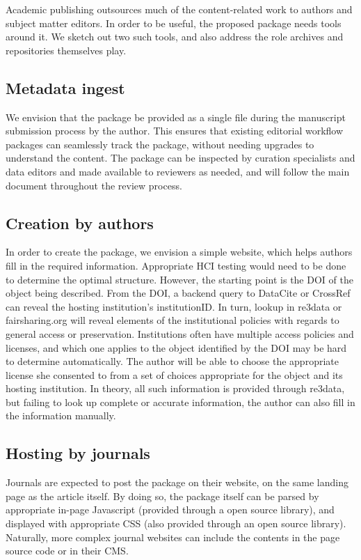 Academic publishing outsources much of the content-related work to authors and subject matter editors. In order to be useful, the proposed package needs tools around it. We sketch out two such tools, and also address the role archives and repositories themselves play. 
\subsection{Metadata ingest}

We envision that the package be provided as a single file during the manuscript submission process by the author. This ensures that existing editorial workflow packages can seamlessly track the package, without needing upgrades to understand the content. The package can be inspected by curation specialists and data editors and made available to reviewers as needed, and will follow the main document throughout the review process. 
           
\subsection{Creation by authors}
In order to create the package, we envision a simple website, which helps authors fill in the required information. Appropriate \ac{HCI} testing would need to be done to determine the optimal structure. However, the starting point is the DOI of the object being described. From the DOI, a backend query to DataCite or CrossRef can reveal the hosting institution's institutionID. In turn, lookup in re3data or fairsharing.org will reveal elements of the institutional policies with regards to general access or preservation. Institutions often have multiple access policies and licenses, and which one applies to the object identified by the DOI may be hard to determine automatically. The author will be able to choose the appropriate license she consented to from a set of choices appropriate for the object and its hosting institution. In theory, all such information is provided through re3data, but failing to look up complete or accurate information, the author can also fill in the information manually. 
           
\subsection{Hosting by journals}
Journals are expected to post the package on their website, on the same landing page as the article itself. By doing so, the package itself can be parsed by appropriate in-page Javascript (provided through a open source library), and displayed with appropriate CSS (also provided through an open source library). Naturally, more complex journal websites can include the contents in the page source code or in their \ac{CMS}. 